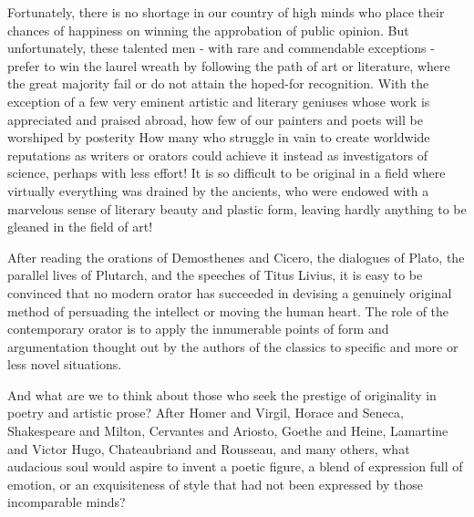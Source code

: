 \documentclass{article}
\begin{document}
Fortunately, there is no shortage in our country of high minds who place their chances of happiness on winning the approbation of public opinion. But unfortunately, these talented men - with rare and commendable exceptions - prefer to win the laurel wreath by following the path of art or literature, where the great majority fail or do not attain the hoped-for recognition. With the exception of a few very eminent artistic and literary geniuses whose work is appreciated and praised abroad, how few of our painters and poets will be worshiped by posterity\! How many who struggle in vain to create worldwide reputations as writers or orators could achieve it instead as investigators of science, perhaps with less effort! It is so difficult to be original in a field where virtually everything was drained by the ancients, who were endowed with a marvelous sense of literary beauty and plastic form, leaving hardly anything to be gleaned in the field of art!

After reading the orations of Demosthenes and Cicero, the dialogues of Plato, the parallel lives of Plutarch, and the speeches of Titus Livius, it is easy to be convinced that no modern orator has succeeded in devising a genuinely original method of persuading the intellect or moving the human heart. The role of the contemporary orator is to apply the innumerable points of form and argumentation thought out by the authors of the classics to specific and more or less novel situations.

And what are we to think about those who seek the prestige of originality in poetry and artistic prose? After Homer and Virgil, Horace and Seneca, Shakespeare and Milton, Cervantes and Ariosto, Goethe and Heine, Lamartine and Victor Hugo, Chateaubriand and Rousseau, and many others, what audacious soul would aspire to invent a poetic figure, a blend of expression full of emotion, or an exquisiteness of style that had not been expressed by those incomparable minds?
\end{document}
